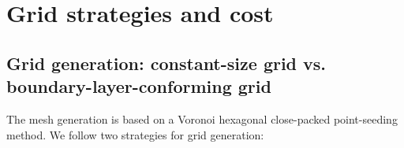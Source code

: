 \documentclass{ctr}
\begin{document}
\section{Grid strategies and cost}\label{sec:gridding}

\subsection{Grid generation: constant-size grid vs. boundary-layer-conforming grid}
\label{subsec:tbl}

The mesh generation is based on a Voronoi hexagonal close-packed
point-seeding method. We follow two strategies for grid generation:
%
\end{document}
